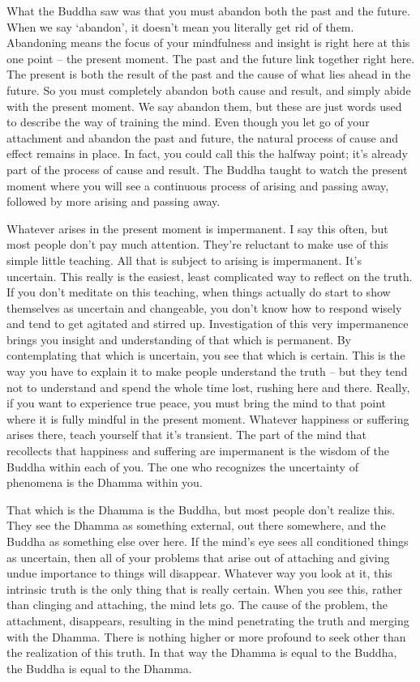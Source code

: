 What the Buddha saw was that you must abandon both the past and the future. When we say `abandon', it doesn't mean you literally get rid of them. Abandoning means the focus of your mindfulness and insight is right here at this one point -- the present moment. The past and the future link together right here. The present is both the result of the past and the cause of what lies ahead in the future. So you must completely abandon both cause and result, and simply abide with the present moment. We say abandon them, but these are just words used to describe the way of training the mind. Even though you let go of your attachment and abandon the past and future, the natural process of cause and effect remains in place. In fact, you could call this the halfway point; it's already part of the process of cause and result. The Buddha taught to watch the present moment where you will see a continuous process of arising and passing away, followed by more arising and passing away.

Whatever arises in the present moment is impermanent. I say this often, but most people don't pay much attention. They're reluctant to make use of this simple little teaching. All that is subject to arising is impermanent. It's uncertain. This really is the easiest, least complicated way to reflect on the truth. If you don't meditate on this teaching, when things actually do start to show themselves as uncertain and changeable, you don't know how to respond wisely and tend to get agitated and stirred up. Investigation of this very impermanence brings you insight and understanding of that which is permanent. By contemplating that which is uncertain, you see that which is certain. This is the way you have to explain it to make people understand the truth -- but they tend not to understand and spend the whole time lost, rushing here and there. Really, if you want to experience true peace, you must bring the mind to that point where it is fully mindful in the present moment. Whatever happiness or suffering arises there, teach yourself that it's transient. The part of the mind that recollects that happiness and suffering are impermanent is the wisdom of the Buddha within each of you. The one who recognizes the uncertainty of phenomena is the Dhamma within you. 

That which is the Dhamma is the Buddha, but most people don't realize this. They see the Dhamma as something external, out there somewhere, and the Buddha as something else over here. If the mind's eye sees all conditioned things as uncertain, then all of your problems that arise out of attaching and giving undue importance to things will disappear. Whatever way you look at it, this intrinsic truth is the only thing that is really certain. When you see this, rather than clinging and attaching, the mind lets go. The cause of the problem, the attachment, disappears, resulting in the mind penetrating the truth and merging with the Dhamma. There is nothing higher or more profound to seek other than the realization of this truth. In that way the Dhamma is equal to the Buddha, the Buddha is equal to the Dhamma.

